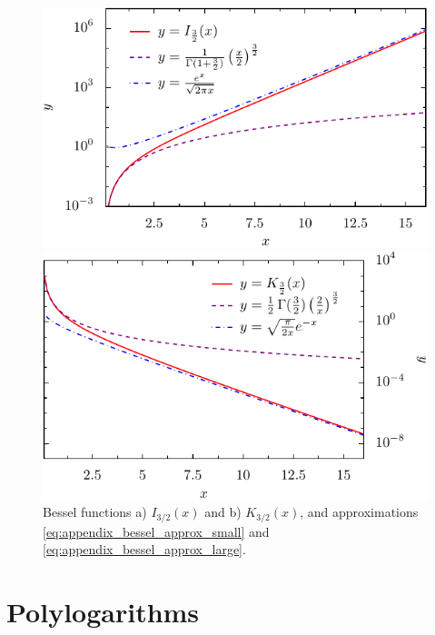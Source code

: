 \begin{figure}
    \begin{minipage}[b]{.5\linewidth}
    \centering
    \includegraphics[scale=0.8]{plots/iv_approx.pdf}
    \end{minipage}%
    \begin{minipage}[b]{.5\linewidth}
    \centering
    \includegraphics[scale=0.8]{plots/kv_approx.pdf}
    \end{minipage}
  \caption{Bessel functions a) $I_{3/2}(x)$ and b) $K_{3/2}(x)$, and approximations \eqref{eq:appendix_bessel_approx_small} and \eqref{eq:appendix_bessel_approx_large}.}
  \label{fig:appendix_ivkv_approx}
\end{figure}


\section{Polylogarithms}
\label{appendix_polylog}

